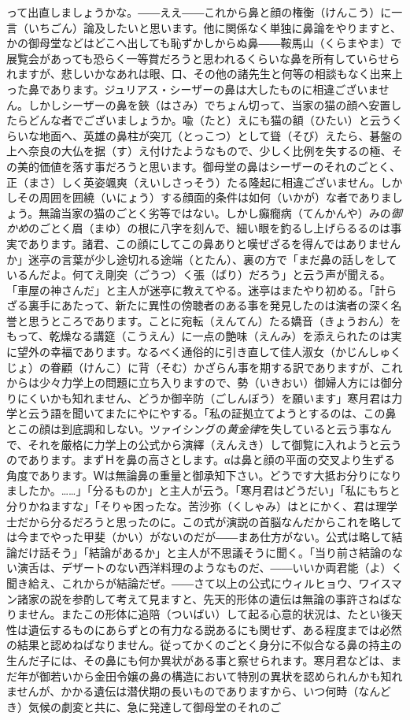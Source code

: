 \documentclass{book}
\begin{document}
って出直しましょうかな。――ええ――これから鼻と顔の権衡（けんこう）に一言（いちごん）論及したいと思います。他に関係なく単独に鼻論をやりますと、かの御母堂などはどこへ出しても恥ずかしからぬ鼻――鞍馬山（くらまやま）で展覧会があっても恐らく一等賞だろうと思われるくらいな鼻を所有していらせられますが、悲しいかなあれは眼、口、その他の諸先生と何等の相談もなく出来上った鼻であります。ジュリアス・シーザーの鼻は大したものに相違ございません。しかしシーザーの鼻を鋏（はさみ）でちょん切って、当家の猫の顔へ安置したらどんな者でございましょうか。喩（たと）えにも猫の額（ひたい）と云うくらいな地面へ、英雄の鼻柱が突兀（とっこつ）として聳（そび）えたら、碁盤の上へ奈良の大仏を据（す）え付けたようなもので、少しく比例を失するの極、その美的価値を落す事だろうと思います。御母堂の鼻はシーザーのそれのごとく、正（まさ）しく英姿颯爽（えいしさっそう）たる隆起に相違ございません。しかしその周囲を囲繞（いにょう）する顔面的条件は如何（いかが）な者でありましょう。無論当家の猫のごとく劣等ではない。しかし癲癇病（てんかんや）みの\emph{御かめ}のごとく眉（まゆ）の根に八字を刻んで、細い眼を釣るし上げらるるのは事実であります。諸君、この顔にしてこの鼻ありと嘆ぜざるを得んではありませんか」迷亭の言葉が少し途切れる途端（とたん）、裏の方で「まだ鼻の話しをしているんだよ。何てえ剛突（ごうつ）く張（ばり）だろう」と云う声が聞える。「車屋の神さんだ」と主人が迷亭に教えてやる。迷亭はまたやり初める。「計らざる裏手にあたって、新たに異性の傍聴者のある事を発見したのは演者の深く名誉と思うところであります。ことに宛転（えんてん）たる嬌音（きょうおん）をもって、乾燥なる講筵（こうえん）に一点の艶味（えんみ）を添えられたのは実に望外の幸福であります。なるべく通俗的に引き直して佳人淑女（かじんしゅくじょ）の眷顧（けんこ）に背（そむ）かざらん事を期する訳でありますが、これからは少々力学上の問題に立ち入りますので、勢（いきおい）御婦人方には御分りにくいかも知れません、どうか御辛防（ごしんぼう）を願います」寒月君は力学と云う語を聞いてまたにやにやする。「私の証拠立てようとするのは、この鼻とこの顔は到底調和しない。ツァイシングの\emph{黄金律}を失していると云う事なんで、それを厳格に力学上の公式から演繹（えんえき）して御覧に入れようと云うのであります。まずＨを鼻の高さとします。αは鼻と顔の平面の交叉より生ずる角度であります。Ｗは無論鼻の重量と御承知下さい。どうです大抵お分りになりましたか。\ldots{}\ldots{}」「分るものか」と主人が云う。「寒月君はどうだい」「私にもちと分りかねますな」「そりゃ困ったな。苦沙弥（くしゃみ）はとにかく、君は理学士だから分るだろうと思ったのに。この式が演説の首脳なんだからこれを略しては今までやった甲斐（かい）がないのだが――まあ仕方がない。公式は略して結論だけ話そう」「結論があるか」と主人が不思議そうに聞く。「当り前さ結論のない演舌は、デザートのない西洋料理のようなものだ、――いいか両君能（よ）く聞き給え、これからが結論だぜ。――さて以上の公式にウィルヒョウ、ワイスマン諸家の説を参酌して考えて見ますと、先天的形体の遺伝は無論の事許さねばなりません。またこの形体に追陪（ついばい）して起る心意的状況は、たとい後天性は遺伝するものにあらずとの有力なる説あるにも関せず、ある程度までは必然の結果と認めねばなりません。従ってかくのごとく身分に不似合なる鼻の持主の生んだ子には、その鼻にも何か異状がある事と察せられます。寒月君などは、まだ年が御若いから金田令嬢の鼻の構造において特別の異状を認められんかも知れませんが、かかる遺伝は潜伏期の長いものでありますから、いつ何時（なんどき）気候の劇変と共に、急に発達して御母堂のそれのご
\end{document}
